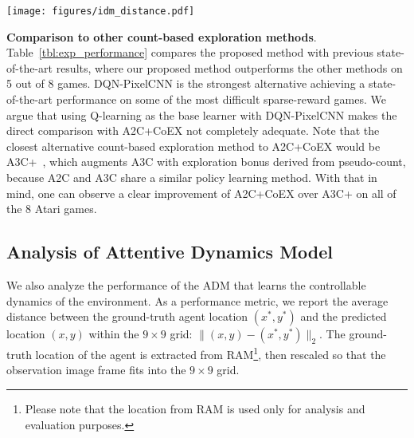\documentclass{article} \usepackage{iclr,times}
\newcommand{\coex}{{CoEX}}
\begin{document}
{\begin{figure*}[t] \begin{center}
\vspace*{-4pt}
    \texttt{[image: figures/idm\_distance.pdf]}
    \vspace*{-15pt}
\caption{
        Performance plot of ADM trained using on-policy samples from the A2C+\coex{} agent.
}
    \label{fig:dynamics}
    \vspace*{-5pt}
    \vspace*{-2pt}
\end{center} \end{figure*}





\textbf{Comparison to other count-based exploration methods}.
Table~\ref{tbl:exp_performance} compares the proposed method with previous state-of-the-art results,
where our proposed method outperforms the other methods on 5 out of 8 games.
DQN-PixelCNN is the strongest alternative achieving a state-of-the-art performance on some of the most difficult sparse-reward games.
We argue that using Q-learning as the base learner with DQN-PixelCNN makes the direct comparison with A2C+\coex{} not completely adequate.
Note that the closest alternative count-based exploration method to A2C+\coex{} would be A3C+~\citep{Bellemare:NIPS2016:UnifyingCount},
which augments A3C \citep{Mnih:ICML2016:A3C} with exploration bonus derived from pseudo-count,
because A2C and A3C share a similar policy learning method.
With that in mind, one can observe a clear improvement of A2C+\coex{} over A3C+ on all of the 8 Atari games.




















\vspace*{-3pt}
\subsection{Analysis of Attentive Dynamics Model}
\vspace*{-4pt}
\label{sec:analysis_inversedynamics}


We also analyze the performance of the ADM that learns
the controllable dynamics of the environment. As a performance metric, we report the average distance
between the ground-truth agent location $(x^*, y^*)$
and the predicted location $(x, y)$ within the $9 \times 9$ grid:
$\|(x, y) - (x^*, y^*)\|_2$.
The ground-truth location of the agent is extracted from RAM\footnote{Please note that the location from RAM is used only for analysis and evaluation purposes.},
then rescaled so that the observation image frame fits into the $9 \times 9$ grid. 



}
\end{document}
